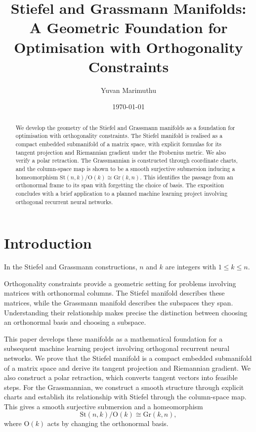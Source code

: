 \documentclass[12pt]{article}
\title{\textbf{Stiefel and Grassmann Manifolds: A Geometric Foundation for Optimisation with Orthogonality Constraints}}
\author{Yuvan Marimuthu}
\date{\today}
\theoremstyle{definition}
\theoremstyle{plain}
\theoremstyle{remark}
\newcommand{\St}{\mathrm{St} (n,k)}
\newcommand{\Gr}{\mathrm{Gr} (k,n)}
\newcommand{\Orth}{\mathrm{O}}               %
\begin{document}
\maketitle


\begin{abstract}
We develop the geometry of the Stiefel and Grassmann manifolds as a foundation for optimisation with orthogonality constraints.
The Stiefel manifold is realised as a compact embedded submanifold of a matrix space, with explicit formulas for its tangent projection and Riemannian gradient under the Frobenius metric.
We also verify a polar retraction.
The Grassmannian is constructed through coordinate charts, and the column-space map is shown to be a smooth surjective submersion inducing a homeomorphism \( \St/\Orth(k)\cong\Gr \).
This identifies the passage from an orthonormal frame to its span with forgetting the choice of basis.
The exposition concludes with a brief application to a planned machine learning project involving orthogonal recurrent neural networks.
\end{abstract}

\newpage
\tableofcontents

\newpage
\section{Introduction}\label{sec:intro}

In the Stiefel and Grassmann constructions, \( n \) and \( k \) are integers with \( 1\le k\le n \).

Orthogonality constraints provide a geometric setting for problems involving matrices with orthonormal columns.
The Stiefel manifold describes these matrices, while the Grassmann manifold describes the subspaces they span.
Understanding their relationship makes precise the distinction between choosing an orthonormal basis and choosing a subspace.

This paper develops these manifolds as a mathematical foundation for a subsequent machine learning project involving orthogonal recurrent neural networks.
We prove that the Stiefel manifold is a compact embedded submanifold of a matrix space and derive its tangent projection and Riemannian gradient.
We also construct a polar retraction, which converts tangent vectors into feasible steps.
For the Grassmannian, we construct a smooth structure through explicit charts and establish its relationship with Stiefel through the column-space map.
This gives a smooth surjective submersion and a homeomorphism
\[
  \St/\Orth(k)\cong\Gr,
\]
where \( \Orth(k) \) acts by changing the orthonormal basis.
\end{document}
